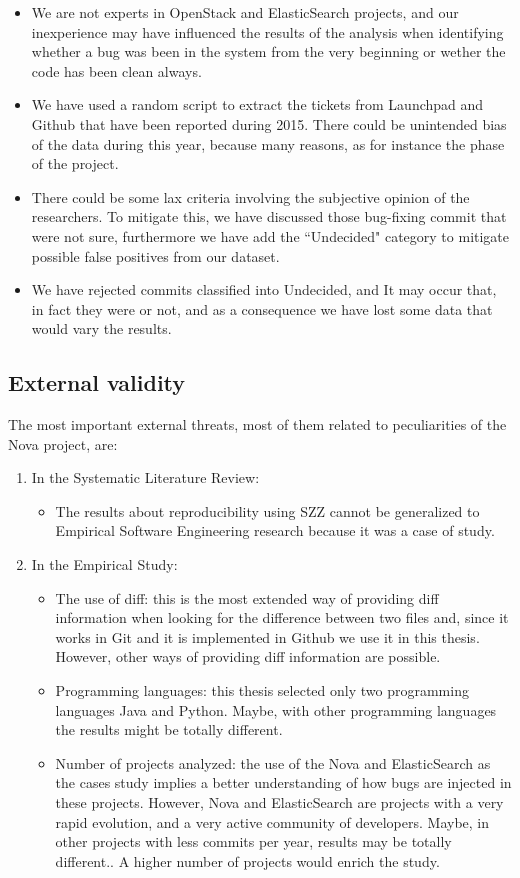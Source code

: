 \documentclass[a4paper, 12pt]{book}
\begin{document}
\begin{enumerate}
\begin{itemize}
			\item We are not experts in OpenStack and ElasticSearch projects, and our inexperience may have influenced the results of the analysis when identifying whether a bug was been in the system from the very beginning or wether the code has been clean always. 
			\item We have used a random script to extract the tickets from Launchpad and Github that have been reported during 2015. There could be unintended bias of the data during this year, because many reasons, as for instance the phase of the project.
			\item There could be some lax criteria involving the subjective opinion of the researchers. To mitigate this, we have discussed those bug-fixing commit that were not sure, furthermore we have add the ``Undecided" category to mitigate possible false positives from our dataset.
			\item We have rejected commits classified into Undecided, and It may occur that, in fact they were \BIC or not, and as a consequence we have lost some data that would vary the results. 	
		\end{itemize}
\end{enumerate}

\subsection{External validity}
The most important external threats, most of them related to peculiarities of the Nova project, are:
\begin{enumerate}
	\item In the Systematic Literature Review: 
		\begin{itemize}
			\item The results about reproducibility using SZZ cannot be generalized to Empirical Software Engineering research because it was a case of study.
		\end{itemize}
	\item {In the Empirical Study}: 
		\begin{itemize}
    			\item The use of diff: this is the most extended way of providing diff information when looking for the difference between two files and, since it works in Git and it is implemented in Github we use it in this thesis. However, other ways of providing diff information are possible.
   			 \item Programming languages: this thesis selected only two programming languages Java and Python. Maybe, with other programming languages the results might be totally different.
			 \item Number of projects analyzed: the use of the Nova and ElasticSearch as the cases study implies a better understanding of how bugs are injected in these projects. However, Nova and ElasticSearch are projects with a very rapid evolution, and a very active community of developers. Maybe, in other projects with less commits per year, results may be totally different.. A higher number of projects would enrich the study.
		\end{itemize}
\end{enumerate}
\end{document}

